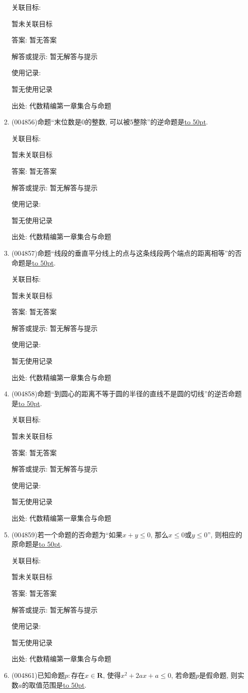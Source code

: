 \documentclass[10pt,a4paper]{article}
\newcommand{\blank}[1]{\underline{\hbox to #1pt{}}}
\begin{document}
\begin{enumerate}[1.]
关联目标:

暂未关联目标

答案: 暂无答案

解答或提示: 暂无解答与提示

使用记录:

暂无使用记录


出处: 代数精编第一章集合与命题
\item { (004856)}命题``末位数是0的整数, 可以被5整除''的逆命题是\blank{50}.


关联目标:

暂未关联目标

答案: 暂无答案

解答或提示: 暂无解答与提示

使用记录:

暂无使用记录


出处: 代数精编第一章集合与命题
\item { (004857)}命题``线段的垂直平分线上的点与这条线段两个端点的距离相等''的否命题是\blank{50}.


关联目标:

暂未关联目标

答案: 暂无答案

解答或提示: 暂无解答与提示

使用记录:

暂无使用记录


出处: 代数精编第一章集合与命题
\item { (004858)}命题``到圆心的距离不等于圆的半径的直线不是圆的切线''的逆否命题是\blank{50}.


关联目标:

暂未关联目标

答案: 暂无答案

解答或提示: 暂无解答与提示

使用记录:

暂无使用记录


出处: 代数精编第一章集合与命题
\item { (004859)}若一个命题的否命题为``如果$x+y\le 0$, 那么$x\le 0$或$y\le 0$'', 则相应的原命题是\blank{50}.


关联目标:

暂未关联目标

答案: 暂无答案

解答或提示: 暂无解答与提示

使用记录:

暂无使用记录


出处: 代数精编第一章集合与命题
\item { (004861)}已知命题$p:$存在$x\in \mathbf{R}$, 使得$x^2+2ax+a\le 0$, 若命题$p$是假命题, 则实数$a$的取值范围是\blank{50}.



\end{enumerate}
\end{document}
